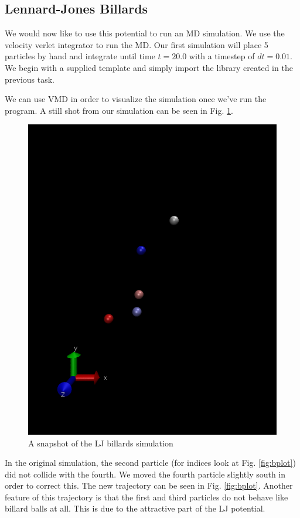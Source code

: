 \documentclass[11pt,a4paper]{scrartcl}
\newcommand{\listfile}[7][MyPythonStyle]{
}
\begin{document}
\subsection{Lennard-Jones Billards}
We would now like to use this potential to run an MD simulation. We use the velocity verlet integrator to run the MD. Our first simulation will place 5 particles by hand and integrate until time $t = 20.0$ with a timestep of $dt = 0.01$. We begin with a supplied template and simply import the library created in the previous task.  
\listfile{../src/ljbillards.py}{ljbillards.py}{1}{3}{Import ljlib.py}{imports}
We can use VMD in order to visualize the simulation once we've run the program. A still shot from our simulation can be seen in Fig. \ref{fig:vmd}.
\begin{figure}[h]
\includegraphics[width=0.7\linewidth]{../fig/vmdscene.png}
  \centering
  \caption{A snapshot of the LJ billards simulation}
\label{fig:vmd}
\end{figure}
In the original simulation, the second particle (for indices look at Fig. \ref{fig:bplot})  did not collide with the fourth. We moved the fourth particle slightly south in order to correct this. The new trajectory can be seen in Fig. \ref{fig:bplot}. Another feature of this trajectory is that the first and third particles do not behave like billard balls at all. This is due to the attractive part of the LJ potential.
\end{document}
